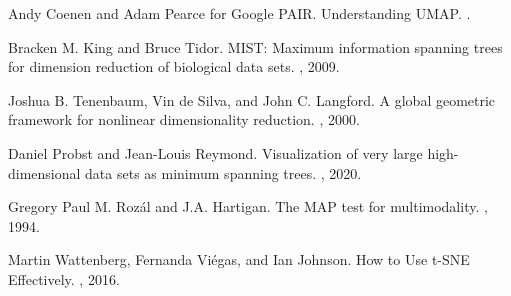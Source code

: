 \documentclass{article}
\begin{document}
\begin{thebibliography}{10}

Andy Coenen and Adam Pearce for Google PAIR.
\newblock Understanding UMAP.
.

Bracken M. King and Bruce Tidor.
\newblock MIST: Maximum information spanning trees for dimension reduction of biological data sets.
, 2009.

Joshua B. Tenenbaum, Vin de Silva, and John C. Langford.
\newblock A global geometric framework for nonlinear dimensionality reduction.
, 2000.

Daniel Probst and Jean-Louis Reymond.
\newblock Visualization of very large high-dimensional data sets as minimum spanning trees.
, 2020.

Gregory Paul M. Roz\'al and J.A. Hartigan.
\newblock The MAP test for multimodality.
, 1994.

Martin Wattenberg, Fernanda Vi\'egas, and Ian Johnson.
\newblock How to Use t-SNE Effectively.
, 2016.

\end{thebibliography}
\end{document}
